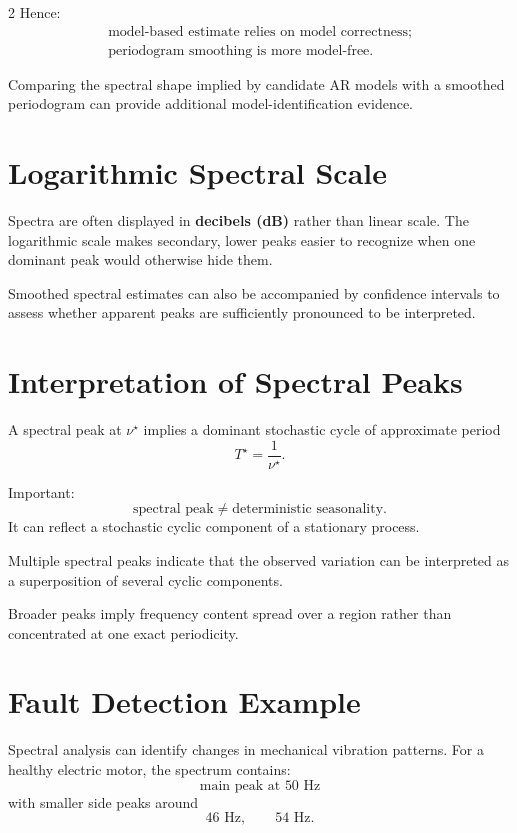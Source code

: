 \documentclass[9pt,a4paper]{extarticle}
\newcommand{\key}[1]{\textbf{#1}}
\begin{document}
\begin{multicols}{2}
Hence:
\[
\boxed{
\begin{array}{c}
\text{model-based estimate relies on model correctness;}\\
\text{periodogram smoothing is more model-free}.
\end{array}
}
\]

Comparing the spectral shape implied by candidate AR models with a smoothed periodogram can provide additional model-identification evidence.

\section{Logarithmic Spectral Scale}

Spectra are often displayed in \key{decibels (dB)} rather than linear scale. The logarithmic scale makes secondary, lower peaks easier to recognize when one dominant peak would otherwise hide them.

Smoothed spectral estimates can also be accompanied by confidence intervals to assess whether apparent peaks are sufficiently pronounced to be interpreted.

\section{Interpretation of Spectral Peaks}

A spectral peak at \(\nu^\star\) implies a dominant stochastic cycle of approximate period
\[
\boxed{T^\star=\frac1{\nu^\star}}.
\]

Important:
\[
\boxed{\text{spectral peak}\neq\text{deterministic seasonality}.}
\]
It can reflect a stochastic cyclic component of a stationary process.

Multiple spectral peaks indicate that the observed variation can be interpreted as a superposition of several cyclic components.

Broader peaks imply frequency content spread over a region rather than concentrated at one exact periodicity.

\section{Fault Detection Example}

Spectral analysis can identify changes in mechanical vibration patterns. For a healthy electric motor, the spectrum contains:
\[
\boxed{\text{main peak at }50\text{ Hz}}
\]
with smaller side peaks around
\[
46\text{ Hz},\qquad54\text{ Hz}.
\]


\end{multicols}
\end{document}
